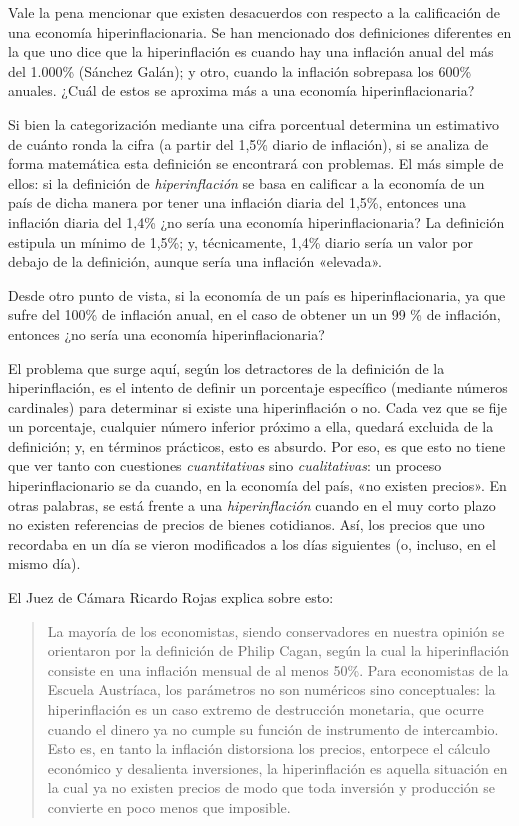 \documentclass[12pt,a4paper,twoside]{book}
\begin{document}
Vale la pena mencionar que existen desacuerdos con respecto a la calificación de una economía hiperinflacionaria. Se han mencionado dos definiciones diferentes en la que uno dice que la hiperinflación es cuando hay una inflación anual del más del 1.000\% (Sánchez Galán); y otro, cuando la inflación sobrepasa los 600\% anuales. ¿Cuál de estos se aproxima más a una economía hiperinflacionaria?

Si bien la categorización mediante una cifra porcentual determina un estimativo de cuánto ronda la cifra (a partir del 1,5\% diario de inflación), si se analiza de forma matemática esta definición se encontrará con problemas. El más simple de ellos: si la definición de \textit{hiperinflación} se basa en calificar a la economía de un país de dicha manera por tener una inflación diaria del 1,5\%, entonces una inflación diaria del 1,4\% ¿no sería una economía hiperinflacionaria? La definición estipula un mínimo de 1,5\%; y, técnicamente, 1,4\% diario sería un valor por debajo de la definición, aunque sería una inflación «elevada».

Desde otro punto de vista, si la economía de un país es hiperinflacionaria, ya que sufre del 100\% de inflación anual, en el caso de obtener un un 99 \% de inflación, entonces ¿no sería una economía hiperinflacionaria?

El problema que surge aquí, según los detractores de la definición de la hiperinflación, es el intento de definir un porcentaje específico (mediante números cardinales) para determinar si existe una hiperinflación o no. Cada vez que se fije un porcentaje, cualquier número inferior próximo a ella, quedará excluida de la definición; y, en términos prácticos, esto es absurdo. Por eso, es que esto no tiene que ver tanto con cuestiones \textit{cuantitativas} sino \textit{cualitativas}: un proceso hiperinflacionario se da cuando, en la economía del país, «no existen precios». En otras palabras, se está frente a una \textit{hiperinflación} cuando en el muy corto plazo no existen referencias de precios de bienes cotidianos. Así, los precios que uno recordaba en un día se vieron modificados a los días siguientes (o, incluso, en el mismo día).

El Juez de Cámara Ricardo Rojas explica sobre esto:

\begin{quotation}
La mayoría de los economistas, siendo conservadores en nuestra opinión se orientaron por la definición de Philip Cagan, según la cual la hiperinflación consiste en una inflación mensual de al menos 50\%. Para economistas de la Escuela Austríaca, los parámetros no son numéricos sino conceptuales: la hiperinflación es un caso extremo de destrucción monetaria, que ocurre cuando el dinero ya no cumple su función de instrumento de intercambio. Esto es, en tanto la inflación distorsiona los precios, entorpece el cálculo económico y desalienta inversiones, la hiperinflación es aquella situación en la cual ya no existen precios de modo que toda inversión y producción se convierte en poco menos que imposible. \cite{rojas:genocidio}
\end{quotation}
\end{document}
